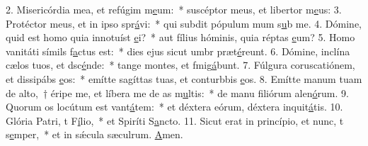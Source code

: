 2. Misericórdia mea, et refúgim m\uline{e}um:~* suscéptor meus, et libertor m\uline{e}us:
3. Protéctor meus, et in ipso spr\uline{á}vi:~* qui subdit pópulum mum s\uline{u}b me.
4. Dómine, quid est homo quia innotuíst \uline{e}i?~* aut fílius hóminis, quia réptas \uline{e}um?
5. Homo vanitáti símils f\uline{a}ctus est:~* dies ejus sicut umbr præt\uline{é}reunt.
6. Dómine, inclína cælos tuos, et dsc\uline{é}nde:~* tange montes, et fmig\uline{á}bunt.
7. Fúlgura coruscatiónem, et dissipábs \uline{e}os:~* emítte sagíttas tuas, et conturbbis \uline{e}os.
8. Emítte manum tuam de alto,~† éripe me, et líbera me de as m\uline{u}ltis:~* de manu filiórum alen\uline{ó}rum.
9. Quorum os locútum est vant\uline{á}tem:~* et déxtera eórum, déxtera inquit\uline{á}tis.
10. Glória Patri, t F\uline{í}lio,~* et Spiríti S\uline{a}ncto.
11. Sicut erat in princípio, et nunc, t s\uline{e}mper,~* et in sǽcula sæculrum. \uline{A}men.
